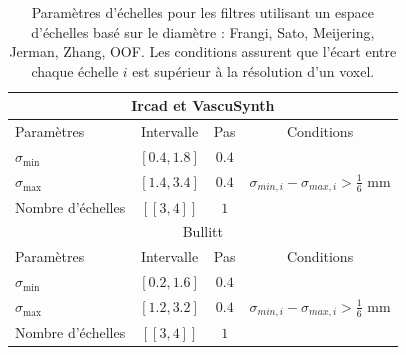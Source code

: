  \begin{table}[H]
  \caption{Paramètres d'échelles pour les filtres utilisant un espace d'échelles basé sur le diamètre :  Frangi, Sato, Meijering, Jerman, Zhang, OOF. Les conditions  assurent que l'écart entre chaque échelle $i$ est supérieur à la résolution d'un voxel.}
  \label{tab:SS_interval}
  \begin{center}
    \begin{tabular}{  l  c  c  c }
      \hline
      \multicolumn{4}{c}{ Ircad et VascuSynth }\\
      \hline
      Paramètres & Intervalle & Pas & Conditions \\
      \hline
      $\sigma_{\min}$ & $[0.4,1.8]$ & $0.4$ & \\
      $\sigma_{\max}$ & $[1.4,3.4]$  & $0.4$ & $\sigma_{min,i} - \sigma_{max,i} > \frac{1}{6}$ mm \\ 
      Nombre d'échelles & $[\![3,4]\!]$ & $1$ & \\
      \hline
      \hline
      \multicolumn{4}{c}{ Bullitt }\\
      \hline
      Paramètres & Intervalle & Pas & Conditions \\
      \hline
      $\sigma_{\min}$ & $[0.2,1.6]$ & $0.4$ & \\
      $\sigma_{\max}$ & $[1.2,3.2]$  & $0.4$ & $\sigma_{min,i} - \sigma_{max,i} > \frac{1}{6}$ mm \\ 
      Nombre d'échelles & $[\![3,4]\!]$ & $1$ & \\
      \hline
    \end{tabular}
  \end{center}
\end{table}

